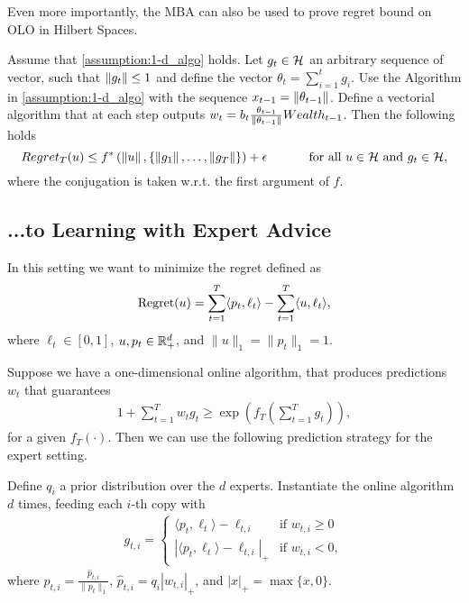 Even more importantly, the \ac{MBA} can also be used to prove regret bound on \ac{OLO} in Hilbert Spaces.

\begin{theorem}
\label{theo:hilbert_reward}
  Assume that \ref{assumption:1-d_algo} holds.
  Let $g_t \in \mathcal{H}$ an arbitrary sequence of vector, such that $\left\|{g_t}\right\| \leq 1$ and define the vector $\theta_t=\sum_{i=1}^{t} g_i$.
  Use the Algorithm in \ref{assumption:1-d_algo} with the sequence $x_{t-1}= \left\|{\theta_{t-1}}\right\|$.
  Define a vectorial algorithm that at each step outputs $w_t = b_t \frac{\theta_{t-1}}{\left\|{\theta_{t-1}}\right\|} Wealth_{t-1}$. Then the following holds
  \[
    Regret_T(u) \leq f^*\left( \left\|{u}\right\|, \left\{\left\|{g_1}\right\|, \ldots, \left\|{g_T}\right\|\right\}\right)+\epsilon \quad \quad \quad \textnormal{ for all } u \in \mathcal{H} \textnormal{ and } g_t \in \mathcal{H},
  \]
  where the conjugation is taken w.r.t. the first argument of $f$.
\end{theorem}

\subsection{...to Learning with Expert Advice}

In this setting we want to minimize the regret defined as
\[
\operatorname{Regret}(u) = \sum_{t=1}^T \langle p_t, \ell_t \rangle - \sum_{t=1}^T \langle u, \ell_t \rangle,
\]
where $\ell_t \in [0,1]$, $u, p_t \in \mathbb{R}^d_+$, and $\|u\|_1 = \|p_t\|_1 = 1$.

Suppose we have a one-dimensional online algorithm, that produces
predictions $w_t$ that guarantees
\begin{align}
\label{eq:def_f}
1 + \sum_{t=1}^T w_t g_t \ge \exp\left(f_T\left(\sum_{t=1}^T g_t\right)\right),
\end{align}
for a given $f_T(\cdot)$. Then we can use the following prediction strategy for the expert setting.

Define $q_i$ a prior distribution over the $d$ experts. Instantiate the online algorithm
$d$ times, feeding each $i$-th copy with
\begin{align}
g_{t,i} = \begin{cases}
\langle p_t, \ell_t\rangle - \ell_{t,i} & \text{if } w_{t,i} \ge 0 \\
|\langle p_t, \ell_t\rangle - \ell_{t,i}|_+ & \text{if } w_{t,i} < 0,
\end{cases}
\end{align}
where $p_{t,i} = \frac{\hat{p}_{t,i}}{\|p_{t}\|_1}$, $\hat{p}_{t,i}=q_i |w_{t,i}|_+$, and $|x|_+=\max\{x,0\}$.

